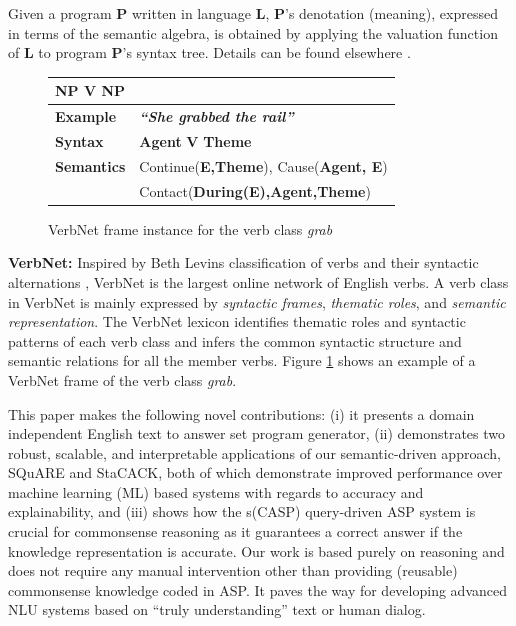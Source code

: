 \documentclass[letterpaper]{article}
\begin{document}
\noindent Given a program \textbf{P} written in language \textbf{L}, \textbf{P}'s denotation (meaning), expressed in terms of the semantic algebra, is obtained by applying the valuation function of \textbf{L} to program \textbf{P}'s syntax tree. Details can be found elsewhere \cite{d_semantics}.

\begin{figure}[t]
\tiny
\centering
\begin{tabular}{|p{1.2cm}|p{6cm}|}
\hline
\multicolumn{2}{|l|}{\textbf{NP V NP}}   \\
\hline
\textbf{Example}  & \textbf{\textit{``She grabbed the rail''}} \\
\hline
\textbf{Syntax}  & \textbf{Agent} \textbf{V} \textbf{Theme}  \\
\hline
\textbf{Semantics}  & \textcolor{burgundy}{Continue(}\textbf{E,Theme}\textcolor{burgundy}{)}, \textcolor{burgundy}{Cause(}\textbf{Agent, E}\textcolor{burgundy}{)}\\
& \textcolor{burgundy}{Contact(}\textbf{During(E),Agent,Theme}\textcolor{burgundy}{)} \\
\hline
\end{tabular}
\caption{VerbNet frame instance for the verb class \textit{grab}}
\label{fig:verbnet-example}
\end{figure}

\medskip

\noindent\textbf{VerbNet:}
Inspired by Beth Levins classification of verbs and their syntactic alternations \cite{verbclasses}, VerbNet \cite{vn} is the largest online network of English verbs. A verb class in VerbNet is mainly expressed by \textit{syntactic frames}, \textit{thematic roles},  and  \textit{semantic representation}. The VerbNet
lexicon identifies  thematic roles and  syntactic patterns of each verb class and infers the common syntactic structure and semantic relations for all the member verbs. Figure \ref{fig:verbnet-example} shows an example of a VerbNet frame of the verb class \textit{grab}.





This paper makes the following novel contributions: (i) it presents a domain independent English text to answer set program generator, (ii) demonstrates two robust, scalable, and interpretable applications of our semantic-driven approach, SQuARE and StaCACK, both of which
demonstrate improved performance over machine learning (ML) based systems with regards to accuracy and explainability,
and (iii) shows how the s(CASP) query-driven ASP system is crucial for commonsense reasoning as it guarantees a correct answer if the knowledge representation is accurate.
Our work is based purely on reasoning and does not require any manual intervention other than providing (reusable) commonsense knowledge coded in ASP. It paves the way for developing advanced NLU systems based on ``truly understanding''  text or human dialog.
\end{document}
